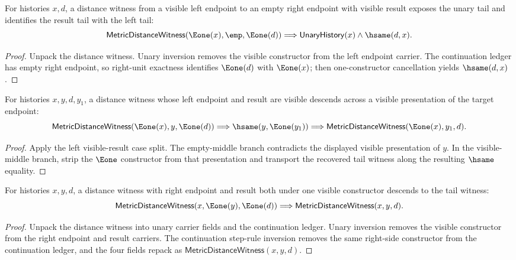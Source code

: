 

\begin{theorem}
\label{thm:metric-distance-witness-left-e1-empty-target-exactness}
For histories $x,d$, a distance witness from a visible left endpoint to an
empty right endpoint with visible result exposes the unary tail and identifies
the result tail with the left tail:
$$
\mathsf{MetricDistanceWitness}(\Eone(x),\emp,\Eone(d))
\Longrightarrow
\mathsf{UnaryHistory}(x)\land \hsame(d,x).
$$
\end{theorem}
\begin{proof}
Unpack the distance witness. Unary inversion removes the visible constructor
from the left endpoint carrier. The continuation ledger has empty right
endpoint, so right-unit exactness identifies $\Eone(d)$ with $\Eone(x)$; then
one-constructor cancellation yields $\hsame(d,x)$.
\end{proof}

\begin{theorem}
\label{thm:metric-distance-witness-left-e1-visible-target-exactness}
For histories $x,y,d,y_1$, a distance witness whose left endpoint and result are
visible descends across a visible presentation of the target endpoint:
$$
\mathsf{MetricDistanceWitness}(\Eone(x),y,\Eone(d))
\Longrightarrow
\hsame(y,\Eone(y_1))
\Longrightarrow
\mathsf{MetricDistanceWitness}(\Eone(x),y_1,d).
$$
\end{theorem}
\begin{proof}
Apply the left visible-result case split. The empty-middle branch contradicts
the displayed visible presentation of $y$. In the visible-middle branch, strip
the $\Eone$ constructor from that presentation and transport the recovered tail
witness along the resulting $\hsame$ equality.
\end{proof}

\begin{theorem}
\label{thm:metric-distance-witness-right-e1-result-exactness}
For histories $x,y,d$, a distance witness with right endpoint and result both
under one visible constructor descends to the tail witness:
$$
\mathsf{MetricDistanceWitness}(x,\Eone(y),\Eone(d))
\Longrightarrow
\mathsf{MetricDistanceWitness}(x,y,d).
$$
\end{theorem}
\begin{proof}
Unpack the distance witness into unary carrier fields and the continuation
ledger. Unary inversion removes the visible constructor from the right endpoint
and result carriers. The continuation step-rule inversion removes the same
right-side constructor from the continuation ledger, and the four fields repack
as $\mathsf{MetricDistanceWitness}(x,y,d)$.
\end{proof}

